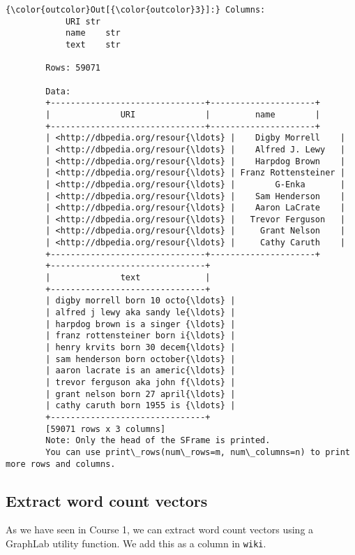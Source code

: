 \documentclass[11pt]{article}
\begin{document}
\begin{Verbatim}[commandchars=\\\{\}]
{\color{outcolor}Out[{\color{outcolor}3}]:} Columns:
        	URI	str
        	name	str
        	text	str
        
        Rows: 59071
        
        Data:
        +-------------------------------+---------------------+
        |              URI              |         name        |
        +-------------------------------+---------------------+
        | <http://dbpedia.org/resour{\ldots} |    Digby Morrell    |
        | <http://dbpedia.org/resour{\ldots} |    Alfred J. Lewy   |
        | <http://dbpedia.org/resour{\ldots} |    Harpdog Brown    |
        | <http://dbpedia.org/resour{\ldots} | Franz Rottensteiner |
        | <http://dbpedia.org/resour{\ldots} |        G-Enka       |
        | <http://dbpedia.org/resour{\ldots} |    Sam Henderson    |
        | <http://dbpedia.org/resour{\ldots} |    Aaron LaCrate    |
        | <http://dbpedia.org/resour{\ldots} |   Trevor Ferguson   |
        | <http://dbpedia.org/resour{\ldots} |     Grant Nelson    |
        | <http://dbpedia.org/resour{\ldots} |     Cathy Caruth    |
        +-------------------------------+---------------------+
        +-------------------------------+
        |              text             |
        +-------------------------------+
        | digby morrell born 10 octo{\ldots} |
        | alfred j lewy aka sandy le{\ldots} |
        | harpdog brown is a singer {\ldots} |
        | franz rottensteiner born i{\ldots} |
        | henry krvits born 30 decem{\ldots} |
        | sam henderson born october{\ldots} |
        | aaron lacrate is an americ{\ldots} |
        | trevor ferguson aka john f{\ldots} |
        | grant nelson born 27 april{\ldots} |
        | cathy caruth born 1955 is {\ldots} |
        +-------------------------------+
        [59071 rows x 3 columns]
        Note: Only the head of the SFrame is printed.
        You can use print\_rows(num\_rows=m, num\_columns=n) to print more rows and columns.
\end{Verbatim}
            
    \subsection{Extract word count
vectors}\label{extract-word-count-vectors}

    As we have seen in Course 1, we can extract word count vectors using a
GraphLab utility function. We add this as a column in \texttt{wiki}.
\end{document}
